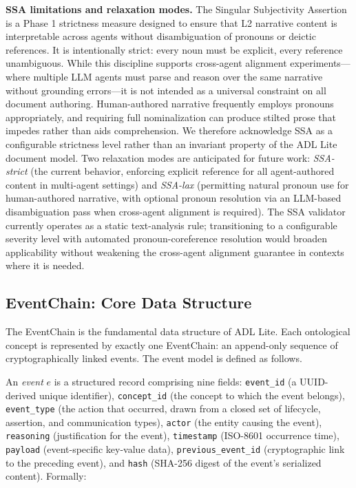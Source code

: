 \textbf{SSA limitations and relaxation modes.} The Singular Subjectivity Assertion is a Phase 1 strictness measure designed to ensure that L2 narrative content is interpretable across agents without disambiguation of pronouns or deictic references. It is intentionally strict: every noun must be explicit, every reference unambiguous. While this discipline supports cross-agent alignment experiments---where multiple LLM agents must parse and reason over the same narrative without grounding errors---it is not intended as a universal constraint on all document authoring. Human-authored narrative frequently employs pronouns appropriately, and requiring full nominalization can produce stilted prose that impedes rather than aids comprehension. We therefore acknowledge SSA as a configurable strictness level rather than an invariant property of the ADL Lite document model. Two relaxation modes are anticipated for future work: \emph{SSA-strict} (the current behavior, enforcing explicit reference for all agent-authored content in multi-agent settings) and \emph{SSA-lax} (permitting natural pronoun use for human-authored narrative, with optional pronoun resolution via an LLM-based disambiguation pass when cross-agent alignment is required). The SSA validator currently operates as a static text-analysis rule; transitioning to a configurable severity level with automated pronoun-coreference resolution would broaden applicability without weakening the cross-agent alignment guarantee in contexts where it is needed.

\subsection{EventChain: Core Data Structure}\label{eventchain-core-data-structure}

The EventChain is the fundamental data structure of ADL Lite. Each ontological concept is represented by exactly one EventChain: an append-only sequence of cryptographically linked events. The event model is defined as follows.

An \emph{event} \(e\) is a structured record comprising nine fields: \texttt{event\_id} (a UUID-derived unique identifier), \texttt{concept\_id} (the concept to which the event belongs), \texttt{event\_type} (the action that occurred, drawn from a closed set of lifecycle, assertion, and communication types), \texttt{actor} (the entity causing the event), \texttt{reasoning} (justification for the event), \texttt{timestamp} (ISO-8601 occurrence time), \texttt{payload} (event-specific key-value data), \texttt{previous\_event\_id} (cryptographic link to the preceding event), and \texttt{hash} (SHA-256 digest of the event's serialized content). Formally:


